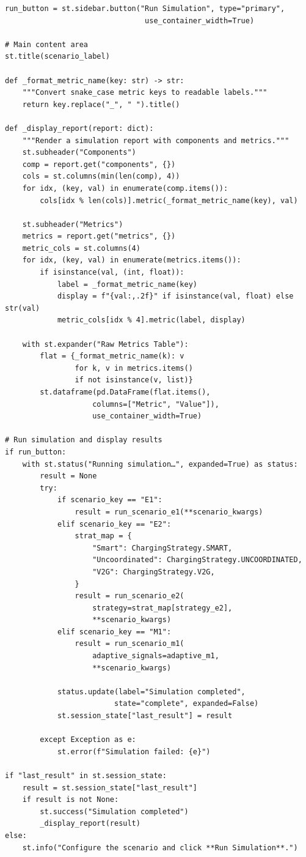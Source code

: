 \begin{listing}[H]
\begin{verbatim}
run_button = st.sidebar.button("Run Simulation", type="primary",
                                use_container_width=True)

# Main content area
st.title(scenario_label)

def _format_metric_name(key: str) -> str:
    """Convert snake_case metric keys to readable labels."""
    return key.replace("_", " ").title()

def _display_report(report: dict):
    """Render a simulation report with components and metrics."""
    st.subheader("Components")
    comp = report.get("components", {})
    cols = st.columns(min(len(comp), 4))
    for idx, (key, val) in enumerate(comp.items()):
        cols[idx % len(cols)].metric(_format_metric_name(key), val)

    st.subheader("Metrics")
    metrics = report.get("metrics", {})
    metric_cols = st.columns(4)
    for idx, (key, val) in enumerate(metrics.items()):
        if isinstance(val, (int, float)):
            label = _format_metric_name(key)
            display = f"{val:,.2f}" if isinstance(val, float) else str(val)
            metric_cols[idx % 4].metric(label, display)

    with st.expander("Raw Metrics Table"):
        flat = {_format_metric_name(k): v
                for k, v in metrics.items()
                if not isinstance(v, list)}
        st.dataframe(pd.DataFrame(flat.items(),
                    columns=["Metric", "Value"]),
                    use_container_width=True)

# Run simulation and display results
if run_button:
    with st.status("Running simulation…", expanded=True) as status:
        result = None
        try:
            if scenario_key == "E1":
                result = run_scenario_e1(**scenario_kwargs)
            elif scenario_key == "E2":
                strat_map = {
                    "Smart": ChargingStrategy.SMART,
                    "Uncoordinated": ChargingStrategy.UNCOORDINATED,
                    "V2G": ChargingStrategy.V2G,
                }
                result = run_scenario_e2(
                    strategy=strat_map[strategy_e2],
                    **scenario_kwargs)
            elif scenario_key == "M1":
                result = run_scenario_m1(
                    adaptive_signals=adaptive_m1,
                    **scenario_kwargs)

            status.update(label="Simulation completed",
                         state="complete", expanded=False)
            st.session_state["last_result"] = result

        except Exception as e:
            st.error(f"Simulation failed: {e}")

if "last_result" in st.session_state:
    result = st.session_state["last_result"]
    if result is not None:
        st.success("Simulation completed")
        _display_report(result)
else:
    st.info("Configure the scenario and click **Run Simulation**.")
\end{verbatim}
\caption{\texttt{code/app.py} --- Streamlit dashboard (condensed)}
\label{lst:app-ui}
\end{listing}

